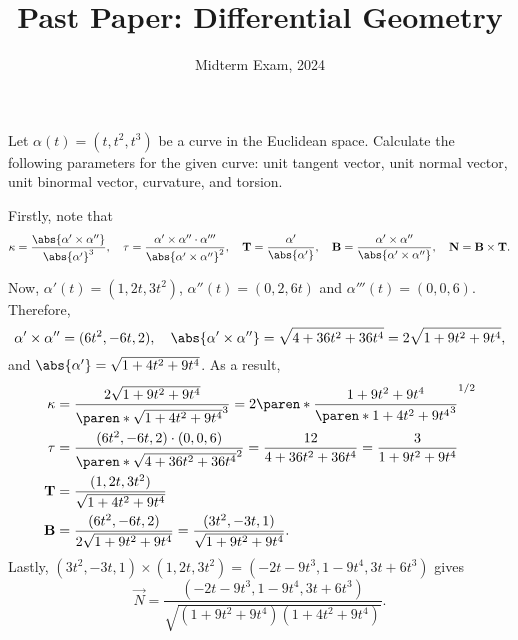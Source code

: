 \documentclass[11pt]{penrose}
\title{Past Paper: Differential Geometry}
\subtitle{Midterm Exam, 2024}
\begin{document}
\maketitle
\warningtext

\begin{problem}{1}
    Let $\alpha(t) = (t, t^2, t^3)$ be a curve in the Euclidean space. Calculate the following parameters for the given curve: unit tangent vector, unit normal vector, unit binormal vector, curvature, and torsion.

    \solution Firstly, note that
    \begin{equation*}
        \kappa = \frac{\abs{\alpha' \times \alpha''}}{\abs{\alpha'}^3},\quad
        \tau = \frac{\alpha' \times \alpha'' \cdot \alpha'''}{\abs{\alpha' \times \alpha''}^2},\quad
        \vec{T} = \frac{\alpha'}{\abs{\alpha'}},\quad
        \vec{B} = \frac{\alpha' \times \alpha''}{\abs{\alpha' \times \alpha''}},\quad
        \vec{N} = \vec{B} \times \vec{T}.
    \end{equation*}

    Now, $\alpha'(t) = (1, 2t, 3t^2)$, $\alpha''(t) = (0, 2, 6t)$ and $\alpha'''(t) = (0, 0, 6)$. Therefore,
    \begin{equation*}
        \alpha' \times \alpha'' = (6t^2, -6t, 2),\quad
        \abs{\alpha' \times \alpha''} = \sqrt{4 + 36t^2 + 36t^4} = 2\sqrt{1 + 9t^2 + 9t^4},
    \end{equation*}
    and $\abs{\alpha'} = \sqrt{1 + 4t^2 + 9t^4}$. As a result,
    \begin{align*}
        \kappa &= \frac{2\sqrt{1 + 9t^2 + 9t^4}}{\paren*{\sqrt{1 + 4t^2 + 9t^4}}^3} = 2 \paren*{\frac{1 + 9t^2 + 9t^4}{\paren*{1 + 4t^2 + 9t^4}^3}}^{1/2}\\
        \tau &= \frac{(6t^2, -6t, 2) \cdot (0,0,6)}{\paren*{\sqrt{4 + 36t^2 + 36t^4}}^2} = \frac{12}{4 + 36t^2 + 36t^4} = \frac{3}{1 + 9t^2 + 9t^4}\\
        \vec{T} &= \frac{(1, 2t, 3t^2)}{\sqrt{1 + 4t^2 + 9t^4}}\\
        \vec{B} &= \frac{(6t^2, -6t, 2)}{2\sqrt{1 + 9t^2 + 9t^4}} = \frac{(3t^2, -3t, 1)}{\sqrt{1 + 9t^2 + 9t^4}}.
    \end{align*}
    Lastly, $(3t^2, -3t, 1) \times (1, 2t, 3t^2) = (-2t-9t^3, 1-9t^4, 3t+6t^3)$ gives
    \begin{equation*}
        \vec{N} = \frac{(-2t-9t^3, 1-9t^4, 3t+6t^3)}{\sqrt{(1 + 9t^2 + 9t^4) (1 + 4t^2 + 9t^4)}}.
    \end{equation*}
\end{problem}
\end{document}
